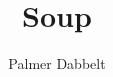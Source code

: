 \documentclass{article}
\author{Palmer Dabbelt}
\title{Soup}
\begin{document}
\maketitle
\tableofcontents
\contentsskip


\end{document}
